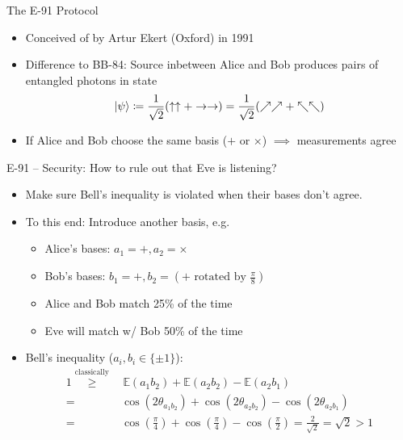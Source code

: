 \documentclass{beamer}
\begin{document}
	\begin{frame}{The E-91 Protocol} %
		\begin{itemize}
			\item Conceived of by Artur Ekert (Oxford) in 1991
			\item Difference to BB-84: Source inbetween Alice and Bob
			produces pairs of entangled photons in state
				\begin{align*}
					\ket{\psi} \coloneqq \frac{1}{\sqrt{2}}(\uparrow \uparrow + \rightarrow
					\rightarrow) = \frac{1}{\sqrt{2}}(\nearrow \nearrow +
					\nwarrow \nwarrow)
				\end{align*}
			\item If Alice and Bob choose the same basis ($+$ or $\times$) $\implies$
			measurements agree
		\end{itemize}
	\end{frame}

	\begin{frame}{E-91 – Security: How to rule out that Eve is listening?}
		\begin{itemize}
			\item Make sure Bell's inequality is violated when their
			bases don't agree.
			\item<2-> To this end: Introduce another basis, e.g.
				\begin{itemize}
					\item Alice's bases: $a_1 = +, a_2 = \times$
					\item Bob's bases: $b_1 = +, b_2 = (+ \text{ rotated by } \frac{\pi}{8})$
					\item Alice and Bob match 25\% of the time
					\item Eve will match w/ Bob 50\% of the time
				\end{itemize}
			\item<3-> Bell's inequality ($a_i, b_i \in \{\pm 1\}$):
				\begin{align*}
					1 \overset{\text{classically}}{\geq}&\, \mathbb{E}(a_1 b_2) + \mathbb{E}(a_2 b_2) - \mathbb{E}(a_2 b_1) \\
					=& \cos(2 \theta_{a_1 b_2}) + \cos(2 \theta_{a_2 b_2}) - \cos(2 \theta_{a_2 b_1}) \\
					=& \cos(\frac{\pi}{4}) + \cos(\frac{\pi}{4}) - \cos(\frac{\pi}{2})
					= \frac{2}{\sqrt{2}} = \sqrt{2} > 1
				\end{align*}
		\end{itemize}
	\end{frame}
\end{document}
